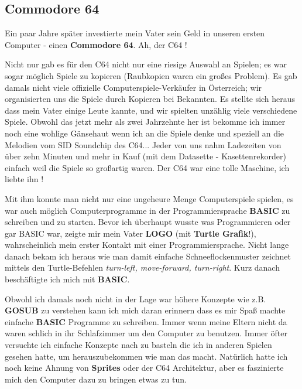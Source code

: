 \documentclass[10pt,a4paper,ngerman,twoside]{article} %
\begin{document}
\begin{multicols}{3}
\subsection*{Commodore 64}

Ein paar Jahre später investierte mein Vater sein Geld in unseren ersten Computer - einen \textbf{Commodore 64}. Ah, der C64 !

Nicht nur gab es für den C64 nicht nur eine riesige Auswahl an Spielen; es war sogar möglich Spiele zu kopieren (Raubkopien waren ein großes Problem). Es gab damals nicht viele offizielle Computerspiele-Verkäufer in Österreich; wir organisierten uns die Spiele durch Kopieren bei Bekannten.  Es stellte sich heraus dass mein Vater einige Leute kannte, und wir spielten unzählig viele verschiedene Spiele. Obwohl das jetzt mehr als zwei Jahrzehnte her ist bekomme ich immer noch eine wohlige Gänsehaut wenn ich an die Spiele denke und speziell an die Melodien vom SID Soundchip des C64...  Jeder von uns nahm Ladezeiten von über zehn Minuten und mehr in Kauf (mit dem Datasette - Kasettenrekorder) einfach weil die Spiele so großartig waren. Der C64 war eine tolle Maschine, ich liebte ihn !

Mit ihm konnte man nicht nur eine ungeheure Menge Computerspiele spielen, es war auch möglich Computerprogramme in der Programmiersprache \textbf{BASIC} zu schreiben und zu starten. Bevor ich überhaupt wusste was Programmieren oder gar BASIC war, zeigte mir mein Vater \textbf{LOGO} (mit \textbf{Turtle Grafik}!), wahrscheinlich mein erster Kontakt mit einer Programmiersprache. Nicht lange danach bekam ich heraus wie man damit einfache Schneeflockenmuster zeichnet mittels den Turtle-Befehlen \textit{turn-left, move-forward, turn-right}. Kurz danach beschäftigte ich mich mit \textbf{BASIC}.

Obwohl ich damals noch nicht in der Lage war höhere Konzepte wie z.B. \textbf{GOSUB} zu verstehen kann ich mich daran erinnern dass es mir Spaß machte einfache \textbf{BASIC} Programme zu schreiben. Immer wenn meine Eltern nicht da waren schlich in ihr Schlafzimmer um den Computer zu benutzen. Immer öfter versuchte ich einfache Konzepte nach zu basteln die ich in anderen Spielen gesehen hatte, um herauszubekommen wie man das macht. Natürlich hatte ich noch keine Ahnung von \textbf{Sprites} oder der C64 Architektur, aber es faszinierte mich den Computer dazu zu bringen etwas zu tun.


\end{multicols}
\end{document}
